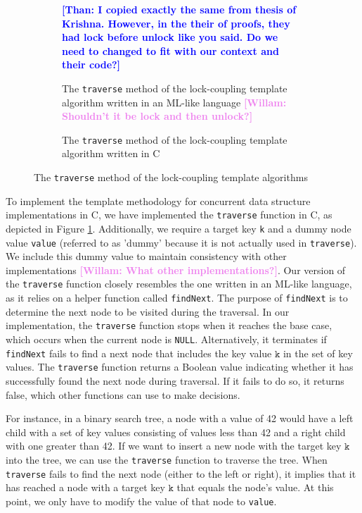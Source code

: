 \documentclass[a4paper,UKenglish,cleveref, autoref, thm-restate]{lipics-v2021}
\newcommand{\than}[1]{\textbf{\textcolor{blue}{[Than: #1]}}}
\newcommand{\wm}[1]{\textbf{\textcolor{violet}{[Willam: #1]}}}
\begin{document}
\begin{figure}[ht]
	\begin{subfigure}[t]{0.45\textwidth}
		 
		\caption{The \lstinline{traverse} method of the lock-coupling template algorithm written in an ML-like language \cite{krishna2019compositional} \wm{Shouldn't it be lock and then unlock?}}
		\than{I copied exactly the same from thesis of Krishna. However, in the their of proofs, they had lock before unlock like you said. Do we need to changed to fit with our context and their code?} 
		\label{traverse_lock_a}	
	\end{subfigure}\qquad
	\begin{subfigure}[t]{0.48\textwidth}
		 
		\caption{The \lstinline{traverse} method of the lock-coupling template algorithm written in C}
		\label{traverse_lock_b}
	\end{subfigure}
	\caption{The \lstinline{traverse} method of the lock-coupling template algorithms}
	\label{traverse_lock}
\end{figure}

To implement the template methodology for concurrent data structure implementations in C, we have implemented the \lstinline{traverse} function in C, as depicted in Figure \ref{traverse_lock_a}. Additionally, we require a target key \lstinline{k} and a dummy node value \lstinline{value} (referred to as 'dummy' because it is not actually used in \lstinline{traverse}). We include this dummy value to maintain consistency with other implementations \wm{What other implementations?}. Our version of the \lstinline{traverse} function closely resembles the one written in an ML-like language, as it relies on a helper function called \lstinline{findNext}. The purpose of \lstinline{findNext} is to determine the next node to be visited during the traversal. In our implementation, the \lstinline{traverse} function stops when it reaches the base case, which occurs when the current node is \lstinline{NULL}. Alternatively, it terminates if \lstinline{findNext} fails to find a next node that includes the key value $\texttt{k}$ in the set of key values. The \lstinline{traverse} function returns a Boolean value indicating whether it has successfully found the next node during traversal. If it fails to do so, it returns false, which other functions can use to make decisions.

For instance, in a binary search tree, a node with a value of 42 would have a left child with a set of key values consisting of values less than 42 and a right child with one greater than 42. If we want to insert a new node with the target key $\texttt{k}$ into the tree, we can use the \lstinline{traverse} function to traverse the tree. When \lstinline{traverse} fails to find the next node (either to the left or right), it implies that it has reached a node with a target key $\texttt{k}$ that equals the node's value. At this point, we only have to modify the value of that node to \lstinline{value}.
\end{document}
